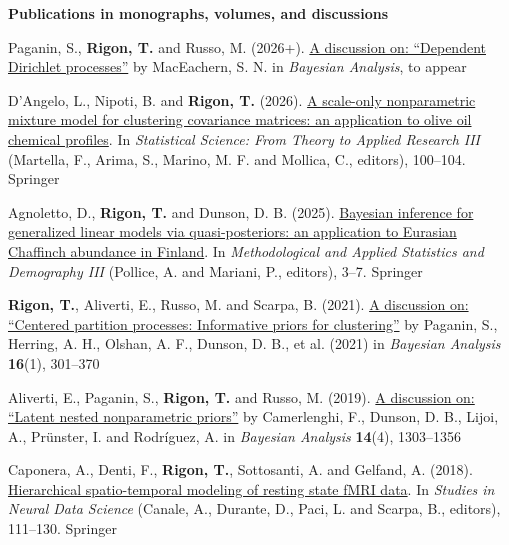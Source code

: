 \documentclass[a4paper,10pt]{article}
\newcommand{\headingfamily}{}
\newif\ifcvfresh\cvfreshfalse
\newcommand{\subhead}[1]{%
  \ifcvfresh\cvfreshfalse\else\par\addvspace{0.4\baselineskip}\fi
  {\headingfamily\bfseries\textcolor{accent}{#1}}\nobreak\par
  \addvspace{0.15\baselineskip}\nobreak}
\begin{document}
\subhead{Publications in monographs, volumes, and discussions}
\begin{pubs}
\item Paganin, S., \textbf{Rigon, T.} and Russo, M. (2026+). \href{https://doi.org/10.1214/26-BA1610}{A discussion on: ``Dependent Dirichlet processes''} by MacEachern, S. N. in \emph{Bayesian Analysis}, to appear
\item D'Angelo, L., Nipoti, B. and \textbf{Rigon, T.} (2026). \href{https://doi.org/10.1007/978-3-032-30881-8_17}{A scale-only nonparametric mixture model for clustering covariance matrices: an application to olive oil chemical profiles}. In \emph{Statistical Science: From Theory to Applied Research III} (Martella, F., Arima, S., Marino, M. F. and Mollica, C., editors), 100--104. Springer
\item Agnoletto, D., \textbf{Rigon, T.} and Dunson, D. B. (2025). \href{https://doi.org/10.1007/978-3-031-64431-3_1}{Bayesian inference for generalized linear models via quasi-posteriors: an application to Eurasian Chaffinch abundance in Finland}. In \emph{Methodological and Applied Statistics and Demography III} (Pollice, A. and Mariani, P., editors), 3--7. Springer
\item \textbf{Rigon, T.}, Aliverti, E., Russo, M. and Scarpa, B. (2021). \href{https://doi.org/10.1214/20-BA1197}{A discussion on: ``Centered partition processes: Informative priors for clustering''} by Paganin, S., Herring, A. H., Olshan, A. F., Dunson, D. B., et al. (2021) in \emph{Bayesian Analysis} \textbf{16}(1), 301--370
\item Aliverti, E., Paganin, S., \textbf{Rigon, T.} and Russo, M. (2019). \href{https://doi.org/10.1214/19-BA1169}{A discussion on: ``Latent nested nonparametric priors''} by Camerlenghi, F., Dunson, D. B., Lijoi, A., Pr\"unster, I. and Rodr\'iguez, A. in \emph{Bayesian Analysis} \textbf{14}(4), 1303--1356
\item Caponera, A., Denti, F., \textbf{Rigon, T.}, Sottosanti, A. and Gelfand, A. (2018). \href{https://doi.org/10.1007/978-3-030-00039-4_7}{Hierarchical spatio-temporal modeling of resting state fMRI data}. In \emph{Studies in Neural Data Science} (Canale, A., Durante, D., Paci, L. and Scarpa, B., editors), 111--130. Springer
\end{pubs}
\end{document}
